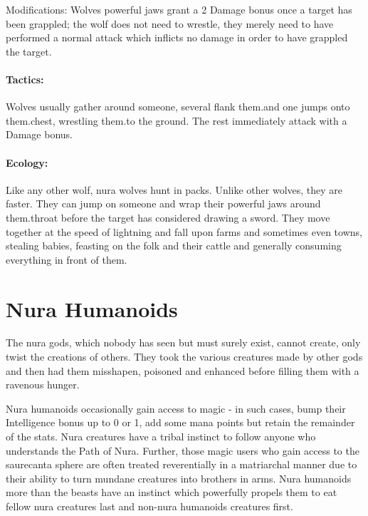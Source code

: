\label{nura_wolf}

\nurawolf

Modifications: Wolves powerful jaws grant a 2 Damage bonus once a target has been grappled; the wolf does not need to wrestle, they merely need to have performed a normal attack which inflicts no damage in order to have grappled the target.

\paragraph{Tactics:} Wolves usually gather around someone, several flank them.and one jumps onto them.chest, wrestling them.to the ground.  The rest immediately attack with a Damage bonus.

\paragraph{Ecology:} Like any other wolf, nura wolves hunt in packs.  Unlike other wolves, they are faster.  They can jump on someone and wrap their powerful jaws around them.throat before the target has considered drawing a sword.  They move together at the speed of lightning and fall upon farms and sometimes even towns, stealing babies, feasting on the folk and their cattle and generally consuming everything in front of them.

\section{Nura Humanoids}

The nura gods, which nobody has seen but must surely exist, cannot create, only twist the creations of others.  They took the various creatures made by other gods and then had them misshapen, poisoned and enhanced before filling them with a ravenous hunger.

Nura humanoids occasionally gain access to magic - in such cases, bump their Intelligence bonus up to 0 or 1, add some mana points but retain the remainder of the stats.  Nura creatures have a tribal instinct to follow anyone who understands the Path of Nura.  Further, those magic users who gain access to the saurecanta sphere are often treated reverentially in a matriarchal manner due to their ability to turn mundane creatures into brothers in arms.  Nura humanoids more than the beasts have an instinct which powerfully propels them to eat fellow nura creatures last and non-nura humanoids creatures first.

